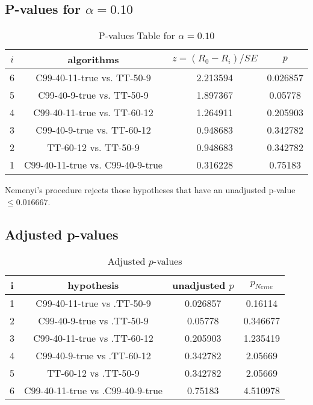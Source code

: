 \documentclass[a4paper,10pt]{article}
\begin{document}
\begin{landscape}
\pagebreak

\subsection{P-values for $\alpha=0.10$}

\begin{table}[!htp]
\centering\scriptsize
\begin{tabular}{cccc}
$i$&algorithms&$z=(R_0 - R_i)/SE$&$p$\\
\hline6&C99-40-11-true vs. TT-50-9&2.213594&0.026857\\
5&C99-40-9-true vs. TT-50-9&1.897367&0.05778\\
4&C99-40-11-true vs. TT-60-12&1.264911&0.205903\\
3&C99-40-9-true vs. TT-60-12&0.948683&0.342782\\
2&TT-60-12 vs. TT-50-9&0.948683&0.342782\\
1&C99-40-11-true vs. C99-40-9-true&0.316228&0.75183\\
\hline
\end{tabular}
\caption{P-values Table for $\alpha=0.10$}
\end{table}Nemenyi's procedure rejects those hypotheses that have an unadjusted p-value $\le0.016667$.

\pagebreak

\subsection{Adjusted p-values}

\begin{table}[!htp]
\centering\scriptsize
\begin{tabular}{cccc}
i&hypothesis&unadjusted $p$&$p_{Neme}$\\
\hline1&C99-40-11-true vs .TT-50-9&0.026857&0.16114\\
2&C99-40-9-true vs .TT-50-9&0.05778&0.346677\\
3&C99-40-11-true vs .TT-60-12&0.205903&1.235419\\
4&C99-40-9-true vs .TT-60-12&0.342782&2.05669\\
5&TT-60-12 vs .TT-50-9&0.342782&2.05669\\
6&C99-40-11-true vs .C99-40-9-true&0.75183&4.510978\\
\hline
\end{tabular}
\caption{Adjusted $p$-values}
\end{table}

\end{landscape}
\end{document}
